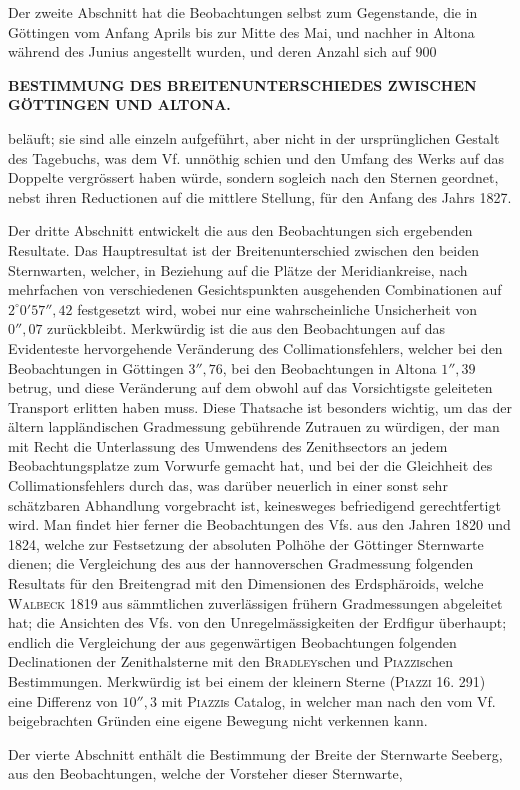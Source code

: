 Der zweite Abschnitt hat die Beobachtungen selbst zum Gegenstande, die
in Göttingen vom Anfang Aprils bis zur Mitte des Mai, und nachher in
Altona während des Junius angestellt wurden, und deren Anzahl sich auf 900
\par

\par\clearpage
\noindent\makebox[12mm][l]{}\parbox[t]{\dimexpr\linewidth-24mm\relax}{\centering\scriptsize\bfseries BESTIMMUNG DES BREITENUNTERSCHIEDES ZWISCHEN GÖTTINGEN UND ALTONA.}\par\medskip

\noindent beläuft; sie sind alle einzeln aufgeführt, aber nicht in der ursprünglichen
Gestalt des Tagebuchs, was dem Vf. unnöthig schien und den Umfang des
Werks auf das Doppelte vergrössert haben würde, sondern sogleich nach den
Sternen geordnet, nebst ihren Reductionen auf die mittlere Stellung, für den
Anfang des Jahrs 1827.

Der dritte Abschnitt entwickelt die aus den Beobachtungen sich ergebenden
Resultate. Das Hauptresultat ist der Breitenunterschied zwischen den
beiden Sternwarten, welcher, in Beziehung auf die Plätze der
Meridiankreise, nach mehrfachen von verschiedenen Gesichtspunkten ausgehenden
Combinationen auf \(2^\circ0'57''{,}42\) festgesetzt wird, wobei nur eine wahrscheinliche
Unsicherheit von \(0''{,}07\) zurückbleibt. Merkwürdig ist die aus den Beobachtungen
auf das Evidenteste hervorgehende Veränderung des Collimationsfehlers, welcher
bei den Beobachtungen in Göttingen \(3''{,}76\), bei den Beobachtungen in Altona
\(1''{,}39\) betrug, und diese Veränderung auf dem obwohl auf das Vorsichtigste
geleiteten Transport erlitten haben muss. Diese Thatsache ist besonders
wichtig, um das der ältern lappländischen Gradmessung gebührende Zutrauen zu
würdigen, der man mit Recht die Unterlassung des Umwendens des
Zenithsectors an jedem Beobachtungsplatze zum Vorwurfe gemacht hat, und bei der
die Gleichheit des Collimationsfehlers durch das, was darüber neuerlich in
einer sonst sehr schätzbaren Abhandlung vorgebracht ist, keinesweges
befriedigend gerechtfertigt wird. Man findet hier ferner die Beobachtungen des Vfs.
aus den Jahren 1820 und 1824, welche zur Festsetzung der absoluten
Polhöhe der Göttinger Sternwarte dienen; die Vergleichung des aus der
hannoverschen Gradmessung folgenden Resultats für den Breitengrad mit den
Dimensionen des Erdsphäroids, welche \textsc{Walbeck} 1819 aus sämmtlichen zuverlässigen
frühern Gradmessungen abgeleitet hat; die Ansichten des Vfs. von den
Unregelmässigkeiten der Erdfigur überhaupt; endlich die Vergleichung der aus
gegenwärtigen Beobachtungen folgenden Declinationen der Zenithalsterne mit
den \textsc{Bradley}schen und \textsc{Piazzi}schen Bestimmungen. Merkwürdig ist bei einem
der kleinern Sterne (\textsc{Piazzi} 16. 291) eine Differenz von \(10''{,}3\) mit \textsc{Piazzi}s
Catalog, in welcher man nach den vom Vf. beigebrachten Gründen eine
eigene Bewegung nicht verkennen kann.

Der vierte Abschnitt enthält die Bestimmung der Breite der Sternwarte
Seeberg, aus den Beobachtungen, welche der Vorsteher dieser Sternwarte,
\par
\par
\endgroup
